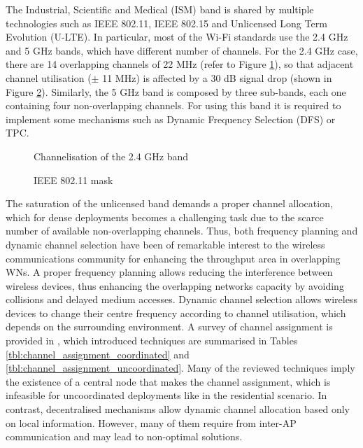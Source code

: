 \documentclass[12pt, a4paper,twoside]{tesi_upf}
\begin{document}
			The Industrial, Scientific and Medical (ISM) band is shared by multiple technologies such as IEEE 802.11, IEEE 802.15 and Unlicensed Long Term Evolution (U-LTE). In particular, most of the Wi-Fi standards use the 2.4 GHz	and 5 GHz bands, which have different number of channels. For the 2.4 GHz case, there are 14 overlapping channels of 22 MHz (refer to Figure \ref{fig:channelisation_wifi}), so that adjacent channel utilisation ($\pm$ 11 MHz) is affected by a 30 dB signal drop (shown in Figure \ref{fig:80211ad_mask}). Similarly, the 5 GHz band is composed by three sub-bands, each one containing four non-overlapping channels. For using this band it is required to implement some mechanisms such as Dynamic Frequency Selection (DFS) or TPC.
			\begin{figure}[h!]
				\centering
				\caption{Channelisation of the 2.4 GHz band}
				\label{fig:channelisation_wifi}
			\end{figure}
			\begin{figure}[h!]
				\centering
				\caption{IEEE 802.11 mask}
				\label{fig:80211ad_mask}
			\end{figure}			
			The saturation of the unlicensed band demands a proper channel allocation, which for dense deployments becomes a challenging task due to the scarce number of available non-overlapping channels. Thus, both frequency planning and dynamic channel selection have been of remarkable interest to the wireless communications community for enhancing the throughput area in overlapping WNs. A proper frequency planning allows reducing the interference between wireless devices, thus enhancing the overlapping networks capacity by avoiding collisions and delayed medium accesses. Dynamic channel selection allows wireless devices to change their centre frequency according to channel utilisation, which depends on the surrounding environment. A survey of channel assignment is provided in \cite{chieochan2010channel}, which introduced techniques are summarised in Tables \ref{tbl:channel_assignment_coordinated} and \ref{tbl:channel_assignment_uncoordinated}. Many of the reviewed techniques imply the existence of a central node that makes the channel assignment, which is infeasible for uncoordinated deployments like in the residential scenario. In contrast, decentralised mechanisms allow dynamic channel allocation based only on local information. However, many of them require from inter-AP communication and may lead to non-optimal solutions.
\end{document}
